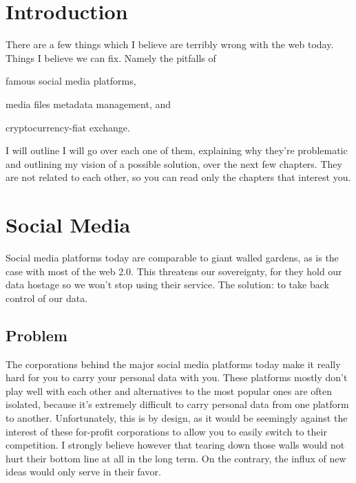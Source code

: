 \documentclass[a4paper,12pt]{report}
\begin{document}
\chapter{Introduction}

There are a few things which I believe are terribly wrong with the web today.
Things I believe we can fix.
Namely the pitfalls of
\begin{inparaenum}[i)]
  \item famous social media platforms,
  \item media files metadata management, and
  \item cryptocurrency-fiat exchange.
\end{inparaenum}
I will outline
I will go over each one of them, explaining why they're problematic and outlining my vision of a possible solution, over the next few chapters.
They are not related to each other, so you can read only the chapters that interest you.


\chapter{Social Media}

Social media platforms today are comparable to giant walled gardens, as is the case with most of the web 2.0.
This threatens our sovereignty, for they hold our data hostage so we won't stop using their service.
The solution: to take back control of our data.

\section{Problem}

The corporations behind the major social media platforms today make it really hard for you to carry your personal data with you\footnotemark.
These platforms mostly don't play well with each other and alternatives to the most popular ones are often isolated, because it's extremely difficult to carry personal data from one platform to another.
Unfortunately, this is by design, as it would be seemingly against the interest of these for-profit corporations to allow you to easily switch to their competition.
I strongly believe however that tearing down those walls would not hurt their bottom line at all in the long term.
On the contrary, the influx of new ideas would only serve in their favor.
\end{document}
